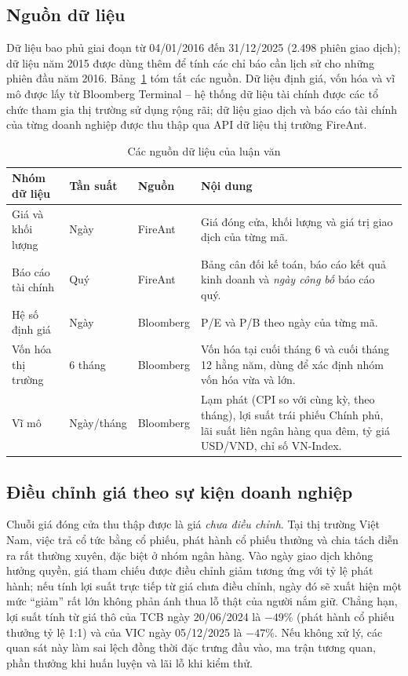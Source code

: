 \subsection{Nguồn dữ liệu}

Dữ liệu bao phủ giai đoạn từ 04/01/2016 đến 31/12/2025 (2.498 phiên giao dịch); dữ liệu năm 2015 được dùng thêm để tính các chỉ báo cần lịch sử cho những phiên đầu năm 2016. Bảng~\ref{tab:sources} tóm tắt các nguồn. Dữ liệu định giá, vốn hóa và vĩ mô được lấy từ Bloomberg Terminal -- hệ thống dữ liệu tài chính được các tổ chức tham gia thị trường sử dụng rộng rãi; dữ liệu giao dịch và báo cáo tài chính của từng doanh nghiệp được thu thập qua API dữ liệu thị trường FireAnt.

\begin{table}[ht]
\centering\small
\caption{Các nguồn dữ liệu của luận văn}
\label{tab:sources}
\begin{tabularx}{\textwidth}{@{}p{3.3cm}p{1.9cm}p{2.5cm}X@{}}
\toprule
Nhóm dữ liệu & Tần suất & Nguồn & Nội dung \\
\midrule
Giá và khối lượng & Ngày & FireAnt & Giá đóng cửa, khối lượng và giá trị giao dịch của từng mã. \\
Báo cáo tài chính & Quý & FireAnt & Bảng cân đối kế toán, báo cáo kết quả kinh doanh và \emph{ngày công bố} báo cáo quý. \\
Hệ số định giá & Ngày & Bloomberg & P/E và P/B theo ngày của từng mã. \\
Vốn hóa thị trường & 6 tháng & Bloomberg & Vốn hóa tại cuối tháng 6 và cuối tháng 12 hằng năm, dùng để xác định nhóm vốn hóa vừa và lớn. \\
Vĩ mô & Ngày/tháng & Bloomberg & Lạm phát (CPI so với cùng kỳ, theo tháng), lợi suất trái phiếu Chính phủ, lãi suất liên ngân hàng qua đêm, tỷ giá USD/VND, chỉ số VN-Index. \\
\bottomrule
\end{tabularx}
\end{table}

\subsection{Điều chỉnh giá theo sự kiện doanh nghiệp}
\label{sec:adjust}

Chuỗi giá đóng cửa thu thập được là giá \emph{chưa điều chỉnh}. Tại thị trường Việt Nam, việc trả cổ tức bằng cổ phiếu, phát hành cổ phiếu thưởng và chia tách diễn ra rất thường xuyên, đặc biệt ở nhóm ngân hàng. Vào ngày giao dịch không hưởng quyền, giá tham chiếu được điều chỉnh giảm tương ứng với tỷ lệ phát hành; nếu tính lợi suất trực tiếp từ giá chưa điều chỉnh, ngày đó sẽ xuất hiện một mức ``giảm'' rất lớn không phản ánh thua lỗ thật của người nắm giữ. Chẳng hạn, lợi suất tính từ giá thô của TCB ngày 20/06/2024 là $-49\%$ (phát hành cổ phiếu thưởng tỷ lệ 1:1) và của VIC ngày 05/12/2025 là $-47\%$. Nếu không xử lý, các quan sát này làm sai lệch đồng thời đặc trưng đầu vào, ma trận tương quan, phần thưởng khi huấn luyện và lãi lỗ khi kiểm thử.

